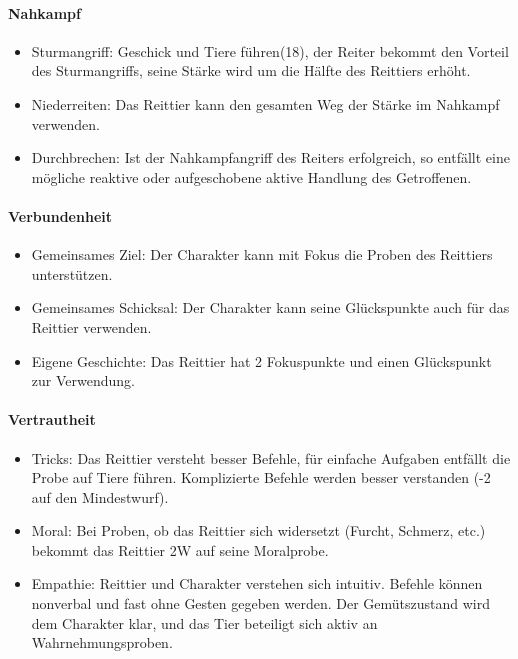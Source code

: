 \documentclass{article}
\begin{document}
\paragraph{Nahkampf}

\begin{itemize}
\item Sturmangriff: Geschick und Tiere führen(18), der Reiter bekommt den Vorteil des Sturmangriffs, seine Stärke wird um die Hälfte des Reittiers erhöht.
\item Niederreiten: Das Reittier kann den gesamten Weg der Stärke im Nahkampf verwenden.
\item Durchbrechen: Ist der Nahkampfangriff des Reiters erfolgreich, so entfällt eine mögliche reaktive oder aufgeschobene aktive Handlung des Getroffenen.
\end{itemize}

\paragraph{Verbundenheit}

\begin{itemize}
\item Gemeinsames Ziel: Der Charakter kann mit Fokus die Proben des Reittiers unterstützen.
\item Gemeinsames Schicksal: Der Charakter kann seine Glückspunkte auch für das Reittier verwenden.
\item Eigene Geschichte: Das Reittier hat 2 Fokuspunkte und einen Glückspunkt zur Verwendung.
\end{itemize}

\paragraph{Vertrautheit}

\begin{itemize}
\item Tricks: Das Reittier versteht besser Befehle, für einfache Aufgaben entfällt die Probe auf Tiere führen. Komplizierte Befehle werden besser verstanden (-2 auf den Mindestwurf).
\item Moral: Bei Proben, ob das Reittier sich widersetzt (Furcht, Schmerz, etc.) bekommt das Reittier 2W auf seine Moralprobe.
\item Empathie: Reittier und Charakter verstehen sich intuitiv. Befehle können nonverbal und fast ohne Gesten gegeben werden. Der Gemütszustand wird dem Charakter klar, und das Tier beteiligt sich aktiv an Wahrnehmungsproben.
\end{itemize}
\end{document}
